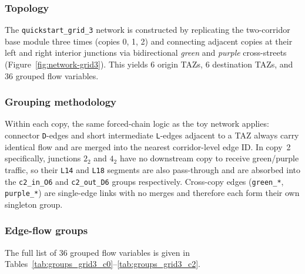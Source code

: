 \documentclass[11pt]{article}
\begin{document}
\subsubsection*{Topology}

The \texttt{quickstart\_grid\_3} network is constructed by replicating the
two-corridor base module three times (copies 0, 1, 2) and connecting adjacent
copies at their left and right interior junctions via bidirectional
\emph{green} and \emph{purple} cross-streets
(Figure~\ref{fig:network-grid3}).
This yields 6 origin TAZs, 6 destination TAZs, and 36 grouped flow variables.

\subsubsection*{Grouping methodology}

Within each copy, the same forced-chain logic as the toy network applies:
connector \texttt{D}-edges and short intermediate \texttt{L}-edges adjacent to
a TAZ always carry identical flow and are merged into the nearest
corridor-level edge ID.
In copy~2 specifically, junctions $2_2$ and $4_2$ have no downstream copy
to receive green/purple traffic, so their \texttt{L14} and \texttt{L18}
segments are also pass-through and are absorbed into the \texttt{c2\_in\_O6}
and \texttt{c2\_out\_D6} groups respectively.
Cross-copy edges (\texttt{green\_*}, \texttt{purple\_*}) are single-edge
links with no merges and therefore each form their own singleton group.

\subsubsection*{Edge-flow groups}

The full list of 36 grouped flow variables is given in
Tables~\ref{tab:groups_grid3_c0}--\ref{tab:groups_grid3_c2}.
\end{document}
